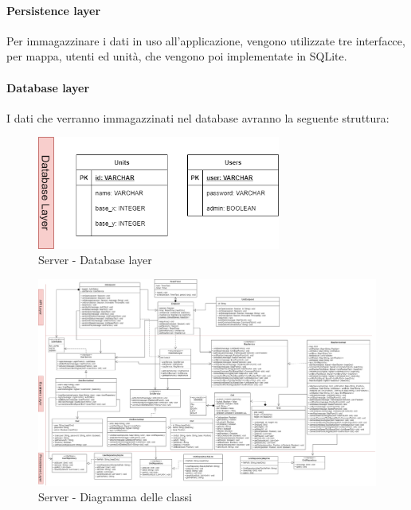\paragraph{Persistence layer}
Per immagazzinare i dati  in uso all'applicazione, vengono utilizzate tre interfacce, per mappa, utenti ed unità, che vengono poi implementate in SQLite.

\paragraph{Database layer}
I dati che verranno immagazzinati nel database avranno la seguente struttura:
\begin{figure}[H]
	\centering
	\includegraphics[width=8cm]{img/server_dblayer.png}
	\caption{Server - Database layer}
\end{figure}

\begin{landscape}
	\begin{figure}[h!]
		\includegraphics[width=24cm]{img/server_classi.png}
		\caption{Server - Diagramma delle classi}
	\end{figure}
\end{landscape}

